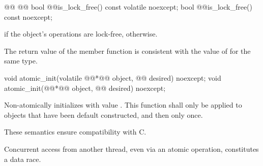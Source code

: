 %
%
%
%
\begin{itemdecl}
@@
@@
bool @@is_lock_free() const volatile noexcept;
bool @@is_lock_free() const noexcept;
\end{itemdecl}

\begin{itemdescr}
\pnum
\returns {} if the object's operations are lock-free,  otherwise.
\begin{note}
The return value of the  member function
is consistent with the value of  for the same type.
\end{note}
\end{itemdescr}

%
\begin{itemdecl}
void atomic_init(volatile @@*@\itcorr[-1]@ object, @@ desired) noexcept;
void atomic_init(@@*@\itcorr[-1]@ object, @@ desired) noexcept;
\end{itemdecl}

\begin{itemdescr}
\pnum
\effects Non-atomically
initializes  with value . This function shall only be applied
to objects that have been default constructed, and then only once.
\begin{note}
These semantics ensure compatibility with C.
\end{note}
\begin{note}
Concurrent access from another thread, even via an atomic operation, constitutes
a data race.
\end{note}

\end{itemdescr}


